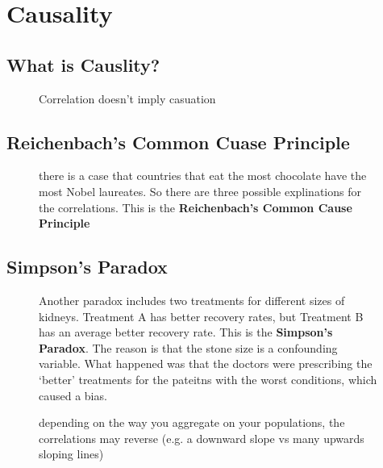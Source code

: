 \documentclass[11pt]{article}
\begin{document}


\tableofcontents

\clearpage

\section{Causality}

\subsection{What is Causlity?}

\begin{figure}[H]
    \centering
    \caption{Correlation doesn't imply casuation}
\end{figure}

\subsection{Reichenbach's Common Cuase Principle}

\begin{figure}[H]
    \centering
    \caption{there is a case that countries that eat the most chocolate have the most Nobel laureates. So there are three possible explinations for the correlations. This is the \textbf{Reichenbach's Common Cause Principle}}
\end{figure}

\subsection{Simpson's Paradox}

\begin{figure}[H]
    \centering
    \caption{Another paradox includes two treatments for different sizes of kidneys. Treatment A has better recovery rates, but Treatment B has an average better recovery rate. This is the \textbf{Simpson's Paradox}. The reason is that the stone size is a confounding variable. What happened was that the doctors were prescribing the `better' treatments for the pateitns with the worst conditions, which caused a bias.}
\end{figure}

\begin{figure}[H]
    \centering
    \caption{depending on the way you aggregate on your populations, the correlations may reverse (e.g. a downward slope vs many upwards sloping lines)}
\end{figure}
\end{document}
